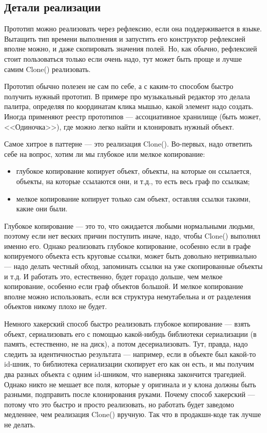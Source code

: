 \documentclass{../../text-style}
\begin{document}
\subsection{Детали реализации}

Прототип можно реализовать через рефлексию, если она поддерживается в языке. Вытащить тип времени выполнения и запустить его конструктор рефлексией вполне можно, и даже скопировать значения полей. Но, как обычно, рефлексией стоит пользоваться только если очень надо, тут может быть проще и лучше самим Clone() реализовать.

Прототип обычно полезен не сам по себе, а с каким-то способом быстро получить нужный прототип. В примере про музыкальный редактор это делала палитра, определяя по координатам клика мышью, какой элемент надо создать. Иногда применяют реестр прототипов --- ассоциативное хранилище (быть может, <<Одиночка>>), где можно легко найти и клонировать нужный объект.

Самое хитрое в паттерне --- это реализация Clone(). Во-первых, надо ответить себе на вопрос, хотим ли мы глубокое или мелкое копирование:

\begin{itemize}
    \item глубокое копирование копирует объект, объекты, на которые он ссылается, объекты, на которые ссылаются они, и т.д., то есть весь граф по ссылкам;
    \item мелкое копирование копирует только сам объект, оставляя ссылки такими, какие они были.
\end{itemize}

Глубокое копирование --- это то, что ожидается любыми нормальными людьми, поэтому если нет веских причин поступить иначе, надо, чтобы Clone() выполнял именно его. Однако реализовать глубокое копирование, особенно если в графе копируемого объекта есть круговые ссылки, может быть довольно нетривиально --- надо делать честный обход, запоминать ссылки на уже скопированные объекты и т.д. И работать это, естественно, будет гораздо дольше, чем мелкое копирование, особенно если граф объектов большой. И мелкое копирование вполне можно использовать, если вся структура немутабельна и от разделения объектов никому плохо не будет.

Немного хакерский способ быстро реализовать глубокое копирование --- взять объект, сериализовать его с помощью какой-нибудь библиотеки сериализации (в память, естественно, не на диск), а потом десериализовать. Тут, правда, надо следить за идентичностью результата --- например, если в объекте был какой-то id-шник, то библиотека сериализации скопирует его как он есть, и мы получим два разных объекта с одним id-шником, что наверняка закончится трагедией. Однако никто не мешает все поля, которые у оригинала и у клона должны быть разными, подправить после клонирования руками. Почему способ хакерский --- потому что это быстро и просто реализовать, но работать будет заведомо медленнее, чем реализация Clone() вручную. Так что в продакшн-коде так лучше не делать.
\end{document}
